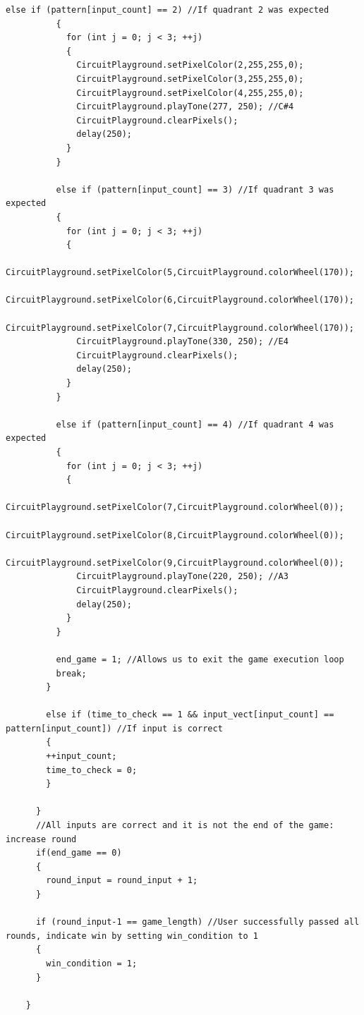 \documentclass[12pt]{article}
\begin{document}
\begin{lstlisting}[language=Arduino]
          else if (pattern[input_count] == 2) //If quadrant 2 was expected
          {
            for (int j = 0; j < 3; ++j)
            {
              CircuitPlayground.setPixelColor(2,255,255,0);
              CircuitPlayground.setPixelColor(3,255,255,0);
              CircuitPlayground.setPixelColor(4,255,255,0);
              CircuitPlayground.playTone(277, 250); //C#4
              CircuitPlayground.clearPixels();
              delay(250);
            }
          }
          
          else if (pattern[input_count] == 3) //If quadrant 3 was expected
          {
            for (int j = 0; j < 3; ++j)
            {
              CircuitPlayground.setPixelColor(5,CircuitPlayground.colorWheel(170));
              CircuitPlayground.setPixelColor(6,CircuitPlayground.colorWheel(170));
              CircuitPlayground.setPixelColor(7,CircuitPlayground.colorWheel(170));
              CircuitPlayground.playTone(330, 250); //E4
              CircuitPlayground.clearPixels();
              delay(250);
            }
          }
          
          else if (pattern[input_count] == 4) //If quadrant 4 was expected
          {
            for (int j = 0; j < 3; ++j)
            {
              CircuitPlayground.setPixelColor(7,CircuitPlayground.colorWheel(0));
              CircuitPlayground.setPixelColor(8,CircuitPlayground.colorWheel(0));
              CircuitPlayground.setPixelColor(9,CircuitPlayground.colorWheel(0));
              CircuitPlayground.playTone(220, 250); //A3
              CircuitPlayground.clearPixels();
              delay(250);
            }
          }
          
          end_game = 1; //Allows us to exit the game execution loop
          break;
        }
        
        else if (time_to_check == 1 && input_vect[input_count] == pattern[input_count]) //If input is correct
        {
        ++input_count;
        time_to_check = 0;
        }
        
      }
      //All inputs are correct and it is not the end of the game: increase round
      if(end_game == 0)
      {
        round_input = round_input + 1;
      }
      
      if (round_input-1 == game_length) //User successfully passed all rounds, indicate win by setting win_condition to 1
      {
        win_condition = 1;
      }
      
    }
    

\end{lstlisting}
\end{document}
